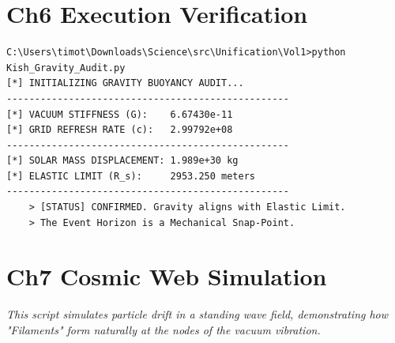 \documentclass[11pt, letterpaper, openany]{book}
\begin{document}
\chapter{Ch6 Execution Verification}
\begin{lstlisting}[style=terminal, caption={Terminal Output: Kish\_Gravity\_Audit.py}]
C:\Users\timot\Downloads\Science\src\Unification\Vol1>python Kish_Gravity_Audit.py
[*] INITIALIZING GRAVITY BUOYANCY AUDIT...
--------------------------------------------------
[*] VACUUM STIFFNESS (G):    6.67430e-11
[*] GRID REFRESH RATE (c):   2.99792e+08
--------------------------------------------------
[*] SOLAR MASS DISPLACEMENT: 1.989e+30 kg
[*] ELASTIC LIMIT (R_s):     2953.250 meters
--------------------------------------------------
    > [STATUS] CONFIRMED. Gravity aligns with Elastic Limit.
    > The Event Horizon is a Mechanical Snap-Point.
\end{lstlisting}

\chapter{Ch7 Cosmic Web Simulation}
\textit{This script simulates particle drift in a standing wave field, demonstrating how "Filaments" form naturally at the nodes of the vacuum vibration.}
\end{document}
